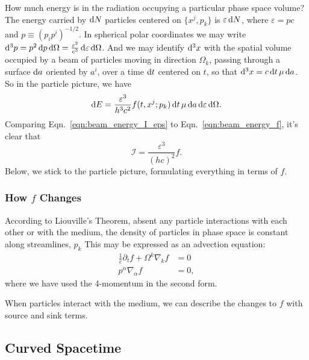 How much energy is in the radiation occupying a particular phase space volume?
The energy carried by $\mathrm{d} N$ particles centered on $\{x^j,p_k\}$
is $\varepsilon\,\mathrm{d} N$,
where $\varepsilon=pc$ and $p\equiv (p_ip^i)^{-1/2}$.
In spherical polar coordinates we may write
$\mathrm{d}^3p=p^2\,\mathrm{d} p\,\mathrm{d}\Omega=\frac{\varepsilon^2}{c^3}\,\mathrm{d}\varepsilon\,\mathrm{d}\Omega$.
And we may identify $\mathrm{d}^3x$
with the spatial volume occupied by a beam of particles
moving in direction $\Omega_k$,
passing through a surface $\mathrm{d} a$
oriented by $a^i$,
over a time $\mathrm{d} t$ centered on $t$,
so that $\mathrm{d}^3x=c\,\mathrm{d} t\,\mu\,\mathrm{d} a$.
So in the particle picture, we have
\begin{equation}
  \label{eqn:beam_energy_f}
  \mathrm{d} E = \frac{\varepsilon^3}{h^3c^2} f(t,x^j;p_k)\,
  \mathrm{d} t\,\mu\,\mathrm{d} a\, \mathrm{d}\varepsilon\,\mathrm{d}\Omega.
\end{equation}
Comparing Eqn.~\ref{eqn:beam_energy_I_eps} to Eqn.~\ref{eqn:beam_energy_f},
it's clear that
\begin{equation}
  \mathcal{I}=\frac{\varepsilon^3}{(hc)^2}f. \nonumber
\end{equation}
Below, we stick to the particle picture, formulating everything in terms of $f$.

\subsubsection{How $f$ Changes}
According to Liouville's Theorem,
absent any particle interactions with each other or with the medium, the density
of particles in phase space is constant along streamlines, $p_k$ This may be
expressed as an advection equation:
\begin{align}
  \frac{1}{c}\partial_t f + \Omega^k\nabla_k f &= 0 \\
  p^\alpha\nabla_\alpha f &= 0,
\end{align}
where we have used the 4-momentum in the second form.

When particles interact with the medium, we can describe the changes to $f$ with
source and sink terms.

\subsection{Curved Spacetime}
